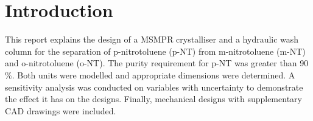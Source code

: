 \section{Introduction}

This report explains the design of a MSMPR crystalliser and a hydraulic wash column for the separation of p-nitrotoluene (p-NT) from m-nitrotoluene (m-NT) and o-nitrotoluene (o-NT). The purity requirement for p-NT was greater than 90 \%. Both units were modelled and appropriate dimensions were determined. A sensitivity analysis was conducted on variables with uncertainty to demonstrate the effect it has on the designs. Finally, mechanical designs with supplementary CAD drawings were included. 